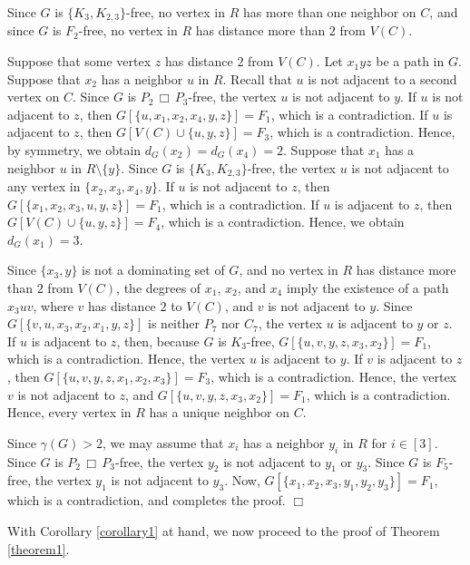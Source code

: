 \documentclass[12pt]{article}
\newcommand{\cart}{\, \Box \,}
\begin{document}
Since $G$ is $\{K_3,K_{2,3}\}$-free, no vertex in $R$ has more than one neighbor on $C$, and
since $G$ is $F_2$-free, no vertex in $R$ has distance more than $2$ from $V(C)$.

Suppose that some vertex $z$ has distance $2$ from $V(C)$.
Let $x_1yz$ be a path in $G$.
Suppose that $x_2$ has a neighbor $u$ in $R$.
Recall that $u$ is not adjacent to a second vertex on $C$.
Since $G$ is $P_2 \cart P_3$-free, the vertex $u$ is not adjacent to $y$.
If $u$ is not adjacent to $z$, then $G[\{ u,x_1,x_2,x_4,y,z\}]=F_1$, which is a contradiction.
If $u$ is adjacent to $z$, then $G[V(C)\cup \{ u,y,z\}]=F_3$, which is a contradiction.
Hence, by symmetry, we obtain $d_G(x_2)=d_G(x_4)=2$.
%
Suppose that $x_1$ has a neighbor $u$ in $R\setminus \{ y\}$.
Since $G$ is $\{ K_3,K_{2,3}\}$-free, the vertex $u$ is not adjacent to any vertex in $\{ x_2,x_3,x_4,y\}$.
If $u$ is not adjacent to $z$, then $G[\{ x_1,x_2,x_3,u,y,z\}]=F_1$, which is a contradiction.
If $u$ is adjacent to $z$, then $G[V(C)\cup \{ u,y,z\}]=F_4$, which is a contradiction.
Hence, we obtain $d_G(x_1)=3$.



Since $\{ x_3,y\}$ is not a dominating set of $G$, and no vertex in $R$ has distance more than $2$ from $V(C)$,
the degrees of $x_1$, $x_2$, and $x_4$ imply the existence of a path $x_3uv$,
where $v$ has distance $2$ to $V(C)$,
and $v$ is not adjacent to $y$.
Since $G[\{ v,u,x_3,x_2,x_1,y,z\}]$ is neither $P_7$ nor $C_7$, the vertex $u$ is adjacent to $y$ or $z$.
If $u$ is adjacent to $z$, then, because $G$ is $K_3$-free,
$G[\{ u,v,y,z,x_3,x_2\}]=F_1$, which is a contradiction.
Hence, the vertex $u$ is adjacent to $y$.
If $v$ is adjacent to $z$, then
$G[\{ u,v,y,z,x_1,x_2,x_3\}]=F_3$, which is a contradiction.
Hence, the vertex $v$ is not adjacent to $z$, and
$G[\{ u,v,y,z,x_3,x_2\}]=F_1$, which is a contradiction.
Hence, every vertex in $R$ has a unique neighbor on $C$.

Since $\gamma(G)>2$, we may assume that $x_i$ has a neighbor $y_i$ in $R$ for $i\in [3]$.
Since $G$ is $P_2 \cart P_3$-free, the vertex $y_2$ is not adjacent to $y_1$ or $y_3$.
Since $G$ is $F_5$-free, the vertex $y_1$ is not adjacent to $y_3$.
Now, $G[\{ x_1,x_2,x_3,y_1,y_2,y_3\}]=F_1$, which is a contradiction,
and completes the proof. $\Box$

\medskip

\noindent With Corollary \ref{corollary1} at hand, we now proceed to the proof of Theorem \ref{theorem1}.

\medskip
\end{document}
